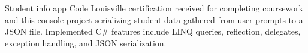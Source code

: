 \datedsubsectionnarrow{}
{Student info app}
{}
{Code Louisville certification received for completing coursework and this \href{https://github.com/jacobarchambault/jacobarchambault.codelou.exerciseproject}{console project} serializing student data gathered from user prompts to a JSON file. Implemented C\# features include LINQ queries, reflection, delegates, exception handling, and JSON serialization.}
